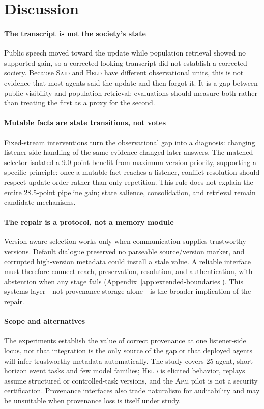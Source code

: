 \documentclass[sigconf,anonymous]{acmart}
\newcommand{\said}{\textsc{Said}}
\newcommand{\held}{\textsc{Held}}
\newcommand{\apm}{\textsc{Apm}}
\begin{document}
\section{Discussion}

\paragraph{The transcript is not the society's state}
Public speech moved toward the update while population retrieval showed no supported gain, so a
corrected-looking transcript did not establish a corrected society.  Because \said{} and
\held{} have different observational units, this is not evidence that most agents said the
update and then forgot it.  It is a gap between public visibility and population retrieval;
evaluations should measure both rather than treating the first as a proxy for the second.

\paragraph{Mutable facts are state transitions, not votes}
Fixed-stream interventions turn the observational gap into a diagnosis: changing listener-side
handling of the same evidence changed later answers.  The matched selector isolated a 9.0-point
benefit from maximum-version priority, supporting a specific principle: once a mutable fact
reaches a listener, conflict resolution should respect update order rather than only repetition.
This rule does not explain the entire 28.5-point pipeline gain; state salience, consolidation, and
retrieval remain candidate mechanisms.

\paragraph{The repair is a protocol, not a memory module}
Version-aware selection works only when communication supplies trustworthy versions.  Default
dialogue preserved no parseable source/version marker, and corrupted high-version metadata could
install a stale value.  A reliable interface must therefore connect reach, preservation,
resolution, and authentication, with abstention when any stage fails
(Appendix~\ref{app:extended-boundaries}).  This systems layer---not provenance storage
alone---is the broader implication of the repair.

\paragraph{Scope and alternatives}
The experiments establish the value of correct provenance at one listener-side locus, not that
integration is the only source of the gap or that deployed agents will infer trustworthy metadata
automatically.  The study covers 25-agent, short-horizon event tasks and few model families;
\held{} is elicited behavior, replays assume structured or controlled-task versions, and the
\apm{} pilot is not a security certification.  Provenance interfaces also trade naturalism for
auditability and may be unsuitable when provenance loss is itself under study.
\end{document}
